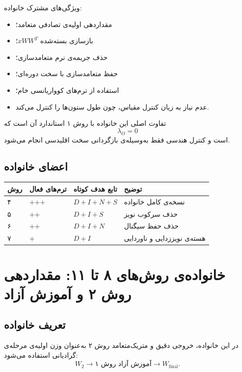\documentclass[a4paper,12pt]{article}
\newcommand{\QR}{\lr{QR}}
\newcommand{\Dterm}{\lr{D}}
\newcommand{\Iterm}{\lr{I}}
\newcommand{\Nterm}{\lr{N}}
\newcommand{\Sterm}{\lr{S}}
\begin{document}
ویژگی‌های مشترک خانواده:
\begin{itemize}
 \item مقداردهی اولیه‌ی تصادفی متعامد؛
 \item بازسازی بسته‌شده $xWW^{T}$؛
 \item حذف جریمه‌ی نرم متعامدسازی؛
 \item حفظ متعامدسازی با \QR{} سخت دوره‌ای؛
 \item استفاده از ترم‌های کوواریانسی خام؛
 \item عدم نیاز به زیان کنترل مقیاس، چون \QR{} طول ستون‌ها را کنترل می‌کند.
\end{itemize}

تفاوت اصلی این خانواده با روش ۱ استاندارد آن است که
\begin{equation}
 \lambda_O=0
\end{equation}
است و کنترل هندسی فقط به‌وسیله‌ی بازگردانی سخت اقلیدسی انجام می‌شود.

\subsection{اعضای خانواده}

\begin{center}
\begin{tabularx}{0.96\textwidth}{|C{1.5cm}|C{3.3cm}|C{4cm}|X|}
\hline
\textbf{روش} & \textbf{ترم‌های فعال} & \textbf{تابع هدف کوتاه} & \textbf{توضیح} \\
\hline
۴ & \Dterm{}+\Iterm{}+\Nterm{}+\Sterm{} & $D+I+N+S$ & نسخه‌ی کامل خانواده \\
\hline
۵ & \Dterm{}+\Iterm{}+\Sterm{} & $D+I+S$ & حذف سرکوب نویز \\
\hline
۶ & \Dterm{}+\Iterm{}+\Nterm{} & $D+I+N$ & حذف حفظ سیگنال \\
\hline
۷ & \Dterm{}+\Iterm{} & $D+I$ & هسته‌ی نویززدایی و ناوردایی \\
\hline
\end{tabularx}
\end{center}

\section{خانواده‌ی روش‌های ۸ تا ۱۱: مقداردهی روش ۲ و آموزش آزاد}

\subsection{تعریف خانواده}

در این خانواده، خروجی دقیق و متریک‌متعامد روش ۲ به‌عنوان وزن اولیه‌ی مرحله‌ی گرادیانی استفاده می‌شود:
\begin{equation}
 W_2
 \longrightarrow
 \text{آموزش آزاد روش ۱}
 \longrightarrow
 W_{\mathrm{final}}.
\end{equation}
\end{document}
